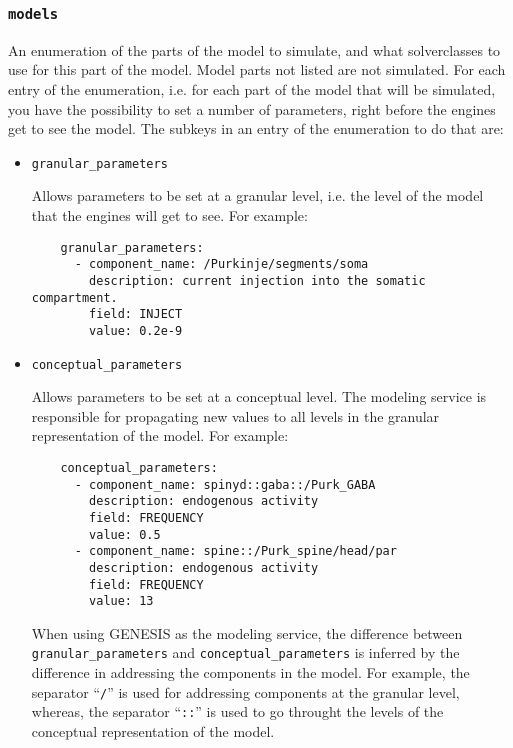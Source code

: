 \documentclass[12pt]{article}
\begin{document}
\subsubsection*{\tt models}

    An enumeration of the parts of the model to simulate, and what solverclasses to use for this part of the model. Model parts not listed are not simulated. For each entry of the enumeration, i.e. for each part of the model that will be simulated, you have the possibility to set a number of parameters, right before the engines get to see the model. The subkeys in an entry of the enumeration to do that are: 

\begin{itemize}

\item[ ] {\tt granular\_parameters}

Allows parameters to be set at a granular level, i.e. the level of the model that the engines will get to see. For example: 

\begin{verbatim}
    granular_parameters:
      - component_name: /Purkinje/segments/soma
        description: current injection into the somatic compartment.
        field: INJECT
        value: 0.2e-9
\end{verbatim}

\item[ ]{\tt conceptual\_parameters}

Allows parameters to be set at a conceptual level. The modeling service is responsible for propagating new values to all levels in the granular representation of the model. For example:

\begin{verbatim}
    conceptual_parameters:
      - component_name: spinyd::gaba::/Purk_GABA
        description: endogenous activity
        field: FREQUENCY
        value: 0.5
      - component_name: spine::/Purk_spine/head/par
        description: endogenous activity
        field: FREQUENCY
        value: 13
\end{verbatim}
When using GENESIS as the modeling service, the difference between {\tt granular\_parameters} and {\tt conceptual\_parameters} is inferred by the difference in addressing the components in the model. For example, the separator ``{\tt /}'' is used for addressing components at the granular level, whereas, the separator ``{\tt ::}'' is used to go throught the levels of the conceptual representation of the model.

\end{itemize}
\end{document}
